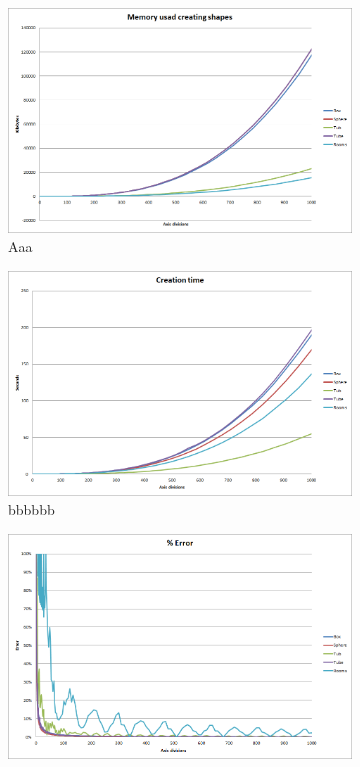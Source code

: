\documentclass[11pt,twoside,a4paper]{report}
\begin{document}
\begin{figure}[h] \centering 
	\begin{subfigure}[h]{0.49\textwidth}
	\includegraphics[width=\textwidth]{images/chart_voxel_creation_memory}
	\caption{Aaa} \label{fig:gull} \end{subfigure}
    \begin{subfigure}[h]{0.49\textwidth}
	\includegraphics[width=\textwidth]{images/chart_voxel_creation_time}
    \caption{bbbbbb} \label{fig:tiger} \end{subfigure}
	\begin{subfigure}[h]{0.49\textwidth} 
	\includegraphics[width=\textwidth]{images/chart_voxel_error}

\end{subfigure}
\end{figure}
\end{document}
